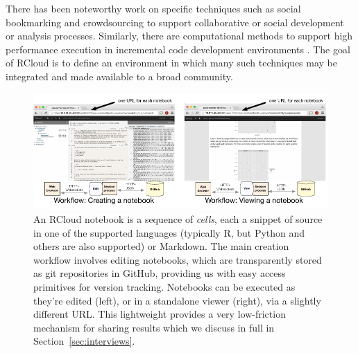 There has been noteworthy work on specific techniques such as
social bookmarking \cite{Millen:2006:DSB} \cite{Heer:2007:VAV}
and crowdsourcing \cite{Fast:2014:ECS} to support collaborative
or social development or analysis processes.
Similarly, there are computational methods to support high
performance execution in incremental code development
environments \cite{Guo:2010:TPI}.
The goal of RCloud is to define an environment in which many such
techniques may be integrated and made available to a broad community.
\begin{figure}
\centering
\includegraphics[width=.95\linewidth]{fig/notebook/notebook.pdf}
\caption{\label{fig:notebook}An RCloud notebook is a sequence of
  \emph{cells}, each a snippet of source in one of the supported languages (typically R, but Python and others are also supported) or Markdown. The main creation workflow involves editing notebooks, which are transparently stored as git repositories in GitHub, providing us with easy access primitives for version tracking. Notebooks can be executed as they're edited (left), or in a standalone viewer (right), via a slightly different URL. This lightweight provides a very low-friction mechanism for sharing results which we discuss in full in Section~\ref{sec:interviews}. }
\end{figure}


